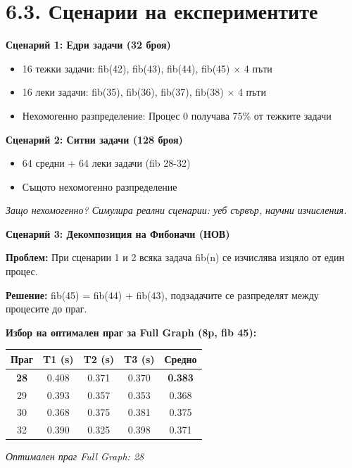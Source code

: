 \documentclass[12pt,a4paper]{article}
\begin{document}
\section*{6.3. Сценарии на експериментите}

\textbf{Сценарий 1: Едри задачи (32 броя)}
\begin{itemize}
    \item 16 тежки задачи: fib(42), fib(43), fib(44), fib(45) $\times$ 4 пъти
    \item 16 леки задачи: fib(35), fib(36), fib(37), fib(38) $\times$ 4 пъти
    \item Нехомогенно разпределение: Процес 0 получава 75\% от тежките задачи
\end{itemize}

\textbf{Сценарий 2: Ситни задачи (128 броя)}
\begin{itemize}
    \item 64 средни + 64 леки задачи (fib 28-32)
    \item Същото нехомогенно разпределение
\end{itemize}

\textit{Защо нехомогенно? Симулира реални сценарии: уеб сървър, научни изчисления.}

\textbf{Сценарий 3: Декомпозиция на Фибоначи (НОВ)}

\textbf{Проблем:} При сценарии 1 и 2 всяка задача fib(n) се изчислява изцяло от един процес.

\textbf{Решение:} fib(45) = fib(44) + fib(43), подзадачите се разпределят между процесите до праг.

\vspace{0.5cm}
\textbf{Избор на оптимален праг за Full Graph (8p, fib 45):}

\begin{center}
\begin{tabular}{|c|c|c|c|c|}
\hline
\textbf{Праг} & \textbf{T1 (s)} & \textbf{T2 (s)} & \textbf{T3 (s)} & \textbf{Средно} \\
\hline
\textbf{28} & 0.408 & 0.371 & 0.370 & \textbf{0.383} \\
\hline
29 & 0.393 & 0.357 & 0.353 & 0.368 \\
\hline
30 & 0.368 & 0.375 & 0.381 & 0.375 \\
\hline
32 & 0.390 & 0.325 & 0.398 & 0.371 \\
\hline
\end{tabular}
\end{center}

\textit{Оптимален праг Full Graph: 28}
\end{document}
